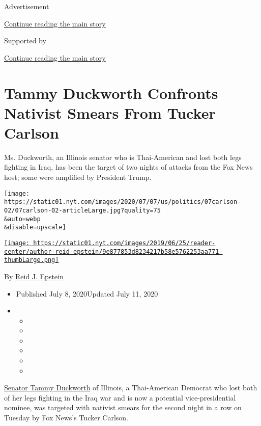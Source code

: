 Advertisement

\protect\hyperlink{after-top}{Continue reading the main story}

Supported by

\protect\hyperlink{after-sponsor}{Continue reading the main story}

\hypertarget{tammy-duckworth-confronts-nativist-smears-from-tucker-carlson}{%
\section{Tammy Duckworth Confronts Nativist Smears From Tucker
Carlson}\label{tammy-duckworth-confronts-nativist-smears-from-tucker-carlson}}

Ms. Duckworth, an Illinois senator who is Thai-American and lost both
legs fighting in Iraq, has been the target of two nights of attacks from
the Fox News host; some were amplified by President Trump.

\texttt{[image: https://static01.nyt.com/images/2020/07/07/us/politics/07carlson-02/07carlson-02-articleLarge.jpg?quality=75\\\&auto=webp\\\&disable=upscale]}

\href{https://www.nytimes.com/by/reid-j-epstein}{\texttt{[image: https://static01.nyt.com/images/2019/06/25/reader-center/author-reid-epstein/9e877853d8234217b58e5762253aa771-thumbLarge.png]}}

By \href{https://www.nytimes.com/by/reid-j-epstein}{Reid J. Epstein}

\begin{itemize}
\item
  Published July 8, 2020Updated July 11, 2020
\item
  \begin{itemize}
  \item
  \item
  \item
  \item
  \item
  \item
  \end{itemize}
\end{itemize}

\href{https://www.nytimes.com/2020/06/25/us/politics/tammy-duckworth-vice-president-joe-biden.html}{Senator
Tammy Duckworth} of Illinois, a Thai-American Democrat who lost both of
her legs fighting in the Iraq war and is now a potential
vice-presidential nominee, was targeted with nativist smears for the
second night in a row on Tuesday by Fox News's Tucker Carlson.

